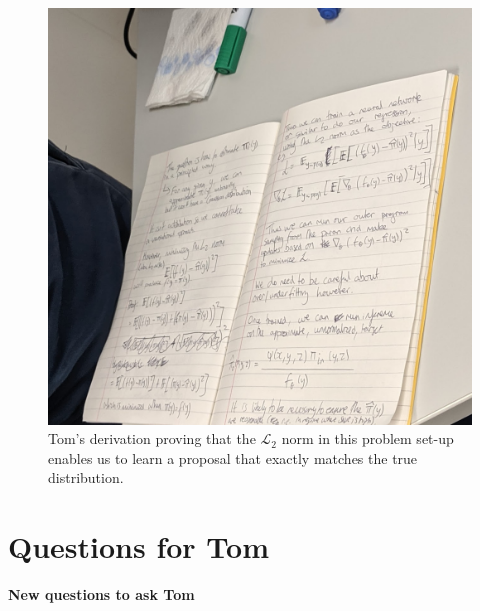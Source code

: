 \documentclass{article}
\begin{document}
\begin{figure}[h!]
  \centering
  \includegraphics[width=\textwidth]{tom_derivation.jpg}
  \caption{Tom's derivation proving that the $\mathcal{L}_2$ norm in this problem set-up enables us to learn a proposal that exactly
  matches the true distribution.  }
  \label{fig:tomfig}
\end{figure}
\section{ Questions for Tom}

\textbf{New questions to ask Tom}
\end{document}
